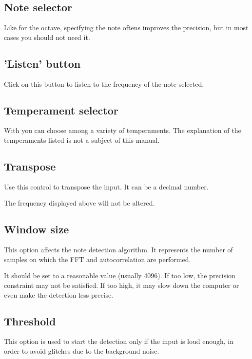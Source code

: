 \subsection{Note selector}\label{note}

Like for the octave, specifying the note oftens improves the precision,
but in most cases you should not need it.

\subsection{'Listen' button}\label{listen}

Click on this button to listen to the frequency of the note selected.

\subsection{Temperament selector}\label{temperament}

With  you can choose among a variety of temperaments.
The explanation of the temperaments listed is not a subject of this
manual.

\subsection{Transpose}\label{transpose}

Use this control to transpose the input. It can be a decimal number.

The frequency displayed above will not be altered.

\subsection{Window size}\label{windowsize}

This option affects the note detection algorithm. It represents the number
of samples on which the FFT and autocorrelation are performed.

It should be set to a reasonable value (usually 4096).
If too low, the precision constraint may not be satisfied. If too high,
it may slow down the computer or even make the detection less precise.

\subsection{Threshold}\label{threshold}

This option is used to start the detection only if the input is loud enough,
in order to avoid glitches due to the background noise.

